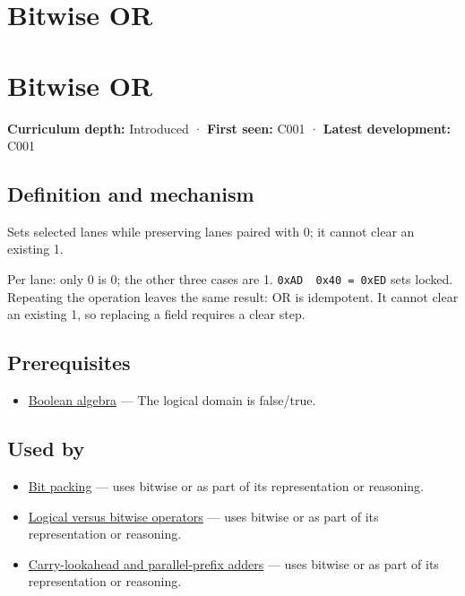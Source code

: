 \hypertarget{appendix-a427ce8ce8a6}{}
\section*{Bitwise OR}
\section{Bitwise OR}\label{bitwise-or}

\textbf{Curriculum depth:} Introduced · \textbf{First seen:} C001 · \textbf{Latest development:} C001

\subsection{Definition and mechanism}\label{definition-and-mechanism}

Sets selected lanes while preserving lanes paired with 0; it cannot clear an existing 1.

Per lane: only 0 is 0; the other three cases are 1. \texttt{0xAD\ \textbar{}\ 0x40\ =\ 0xED} sets locked. Repeating the operation leaves the same result: OR is idempotent. It cannot clear an existing 1, so replacing a field requires a clear step.

\subsection{Prerequisites}\label{prerequisites}

\begin{itemize}
\tightlist
\item
  \hyperref[appendix-24475e1596a8]{Boolean algebra} --- The logical domain is false/true.
\end{itemize}

\subsection{Used by}\label{used-by}

\begin{itemize}
\tightlist
\item
  \hyperref[appendix-1f9963e1a5d1]{Bit packing} --- uses bitwise or as part of its representation or reasoning.
\item
  \hyperref[appendix-fe6b457d68d8]{Logical versus bitwise operators} --- uses bitwise or as part of its representation or reasoning.
\item
  \hyperref[appendix-b5c46b2d94ff]{Carry-lookahead and parallel-prefix adders} --- uses bitwise or as part of its representation or reasoning.
\end{itemize}

